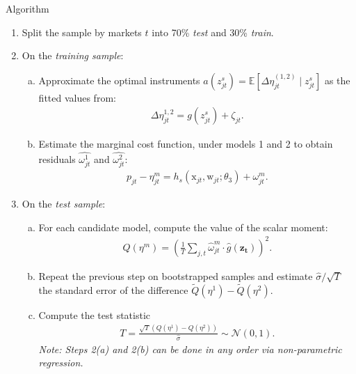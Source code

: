 \documentclass[aspectratio=169,10pt]{beamer}
\begin{document}
\begin{frame}[shrink=25,plain]{Algorithm}
\begin{enumerate}[(1)]
\item Split the sample by markets $t$ into 70\% \textit{test} and 30\% \textit{train}.
\item On the \textit{training sample}:
\begin{enumerate}[(a)]
\item Approximate the optimal instruments $a(z_{jt}^s) = \mathbb{E}[\Delta \eta_{jt}^{(1,2)} \mid z_{jt}^s]$ as the fitted values from:
\begin{align*}
    \Delta\eta_{jt}^{1,2} = g(z_{jt}^s) + \zeta_{jt}.
\end{align*}
\item Estimate the marginal cost function, under models 1 and 2 to obtain residuals $\widehat{\omega_{jt}^{1}}$ and $\widehat{\omega_{jt}^{2}}$:
 \begin{align*}
 p_{jt} -\eta^m_{jt}= h_s(\textrm{x}_{jt},\mathrm{w}_{jt}; \theta_3) + \omega^m_{jt}.
 \end{align*}
\end{enumerate}
\item On the \textit{test sample}:
\begin{enumerate}[(a)]
\item For each candidate model, compute the value of the scalar moment:\footnotemark
\begin{align*}
 Q(\eta^m) =\left(\frac{1}{T}\sum_{j,t} \hat\omega_{jt}^m\cdot \hat{g}(\symbf{z_t}) \right)^2.
\end{align*}
\item Repeat the previous step on bootstrapped samples and estimate $\hat\sigma/\sqrt{T}$ the standard error of the difference $\tilde Q(\eta^1) - \tilde Q(\eta^2)$.
\item Compute the test statistic
\begin{align*}
T = \frac{\sqrt{T} \left(Q(\eta^1) -  Q(\eta^2) \right)}{\widehat{\sigma}} \sim \mathcal{N}(0,1).
\end{align*}
\textit{Note: Steps 2(a) and 2(b) can be done in any order via non-parametric regression.}
\end{enumerate}
\end{enumerate}
\end{frame}
\end{document}

